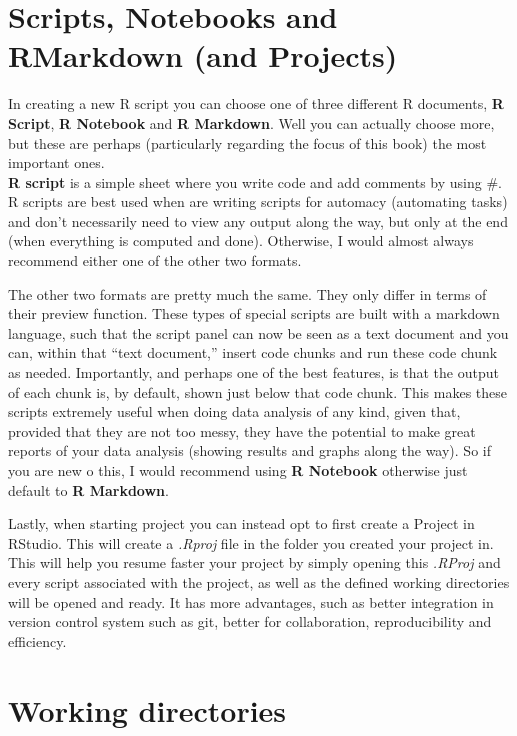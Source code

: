 \documentclass[
]{book}
\begin{document}
\hypertarget{scripts-notebooks-and-rmarkdown-and-projects}{%
\section{Scripts, Notebooks and RMarkdown (and Projects)}\label{scripts-notebooks-and-rmarkdown-and-projects}}

In creating a new R script you can choose one of three different R documents, \textbf{R Script}, \textbf{R Notebook} and \textbf{R Markdown}.
Well you can actually choose more, but these are perhaps (particularly regarding the focus of this book) the most important ones.\\

\textbf{R script} is a simple sheet where you write code and add comments by using \#.
R scripts are best used when are writing scripts for automacy (automating tasks) and don't necessarily need to view any output along the way, but only at the end (when everything is computed and done).
Otherwise, I would almost always recommend either one of the other two formats.

The other two formats are pretty much the same.
They only differ in terms of their preview function.
These types of special scripts are built with a markdown language, such that the script panel can now be seen as a text document and you can, within that ``text document,'' insert code chunks and run these code chunk as needed.
Importantly, and perhaps one of the best features, is that the output of each chunk is, by default, shown just below that code chunk.
This makes these scripts extremely useful when doing data analysis of any kind, given that, provided that they are not too messy, they have the potential to make great reports of your data analysis (showing results and graphs along the way).
So if you are new o this, I would recommend using \textbf{R Notebook} otherwise just default to \textbf{R Markdown}.

Lastly, when starting project you can instead opt to first create a Project in RStudio. This will create a \emph{.Rproj} file in the folder you created your project in. This will help you resume faster your project by simply opening this \emph{.RProj} and every script associated with the project, as well as the defined working directories will be opened and ready. It has more advantages, such as better integration in version control system such as git, better for collaboration, reproducibility and efficiency.

\hypertarget{working-directories}{%
\section{Working directories}\label{working-directories}}
\end{document}
